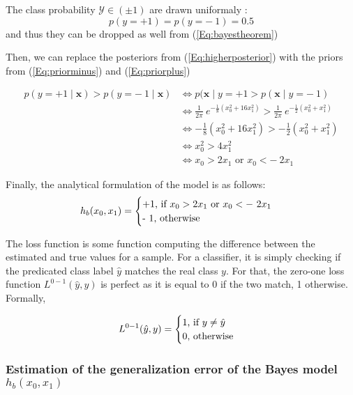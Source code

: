\documentclass{article}
\begin{document}
The class probability $\mathcal{Y} \in (\pm 1)$ are drawn uniformaly :
\begin{equation}
    p(y = + 1) = p(y = -\ 1) = 0.5
\end{equation} and thus they can be dropped as well from (\ref{Eq:bayestheorem})

Then, we can replace the posteriors from (\ref{Eq:higherposterior}) with the priors from (\ref{Eq:priorminus}) and (\ref{Eq:priorplus})  

\begin{equation}
\begin{aligned}
    p(y = + 1  \mid \boldsymbol{x}) > p(y = -\ 1  \mid \boldsymbol{x}) &\Leftrightarrow  p(\boldsymbol{x} \mid y = + 1 > p(\boldsymbol{x} \mid y = -\ 1) \\
    &\Leftrightarrow \frac{1}{2\pi}\ e^{-\frac{1}{8}(x_0^2 + 16x_1^2)} > \frac{1}{2\pi}\ e^{-\frac{1}{2}(x_0^2 + x_1^2)} \\
    &\Leftrightarrow - \frac{1}{8}(x_0^2 + 16x_1^2) > -\frac{1}{2} (x_0^2 +x_1^2)\\
    &\Leftrightarrow x_0^2 > 4x_1^2 \\
    &\Leftrightarrow x_0 > 2x_1 \text{ or } x_0 < -\ 2x_1
\end{aligned}
\label{Eq:threshold}
\end{equation}

Finally, the analytical formulation of the model is as follows:
\[
\textit{$h_b(x_0, x_1)$} =
\begin{cases}
    $+1$ \text{, if } x_0 > 2x_1 \text{ or } x_0 < -\ 2x_1\\
    $-\ 1$ \text{, otherwise}
\end{cases} 
\]




The loss function  is some function computing the difference between the estimated and true values for a sample. For a classifier, it is simply checking if the predicated class label $\hat{y}$ matches the real class $y$. For that, the zero-one loss function $L^{0-1}(\hat{y}, y)$ is perfect as it is equal to 0 if the two match, 1 otherwise. Formally,

\[
L^{0-1}(\hat{y}, y) =
\begin{cases}
    $1$ \text{, if } y \ne \hat{y}\\
    $0$ \text{, otherwise}
\end{cases} 
\]


\subsubsection{Estimation of the generalization error of the Bayes model \textit{$h_b(x_0, x_1)$}}
\end{document}
